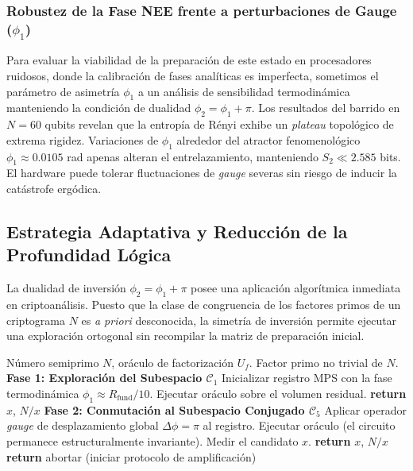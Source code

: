 \documentclass[12pt,a4paper]{article}
\theoremstyle{plain}
\theoremstyle{definition}
\theoremstyle{remark}
\begin{document}
\subsubsection*{Robustez de la Fase NEE frente a perturbaciones de Gauge ($\phi_1$)}

Para evaluar la viabilidad de la preparación de este estado en procesadores ruidosos, donde la calibración de fases analíticas es imperfecta, sometimos el parámetro de asimetría $\phi_1$ a un análisis de sensibilidad termodinámica manteniendo la condición de dualidad $\phi_2 = \phi_1 + \pi$. Los resultados del barrido en $N=60$ qubits revelan que la entropía de Rényi exhibe un \textit{plateau} topológico de extrema rigidez. Variaciones de $\phi_1$ alrededor del atractor fenomenológico $\phi_1 \approx 0.0105$ rad apenas alteran el entrelazamiento, manteniendo $S_2 \ll 2.585$ bits. El hardware puede tolerar fluctuaciones de \textit{gauge} severas sin riesgo de inducir la catástrofe ergódica.

\subsection{Estrategia Adaptativa y Reducción de la Profundidad Lógica}
\label{subsec:estrategia_adaptativa}

La dualidad de inversión $\phi_2 = \phi_1 + \pi$ posee una aplicación algorítmica inmediata en criptoanálisis. Puesto que la clase de congruencia de los factores primos de un criptograma $N$ es \textit{a priori} desconocida, la simetría de inversión permite ejecutar una exploración ortogonal sin recompilar la matriz de preparación inicial.

\begin{algorithm}[H]
\caption{Estrategia Adaptativa de Búsqueda Modular (MST)}
\label{alg:estrategia}
\begin{algorithmic}[1]
\Require Número semiprimo $N$, oráculo de factorización $U_f$.
\Ensure Factor primo no trivial de $N$.
\Statex
\State \textbf{Fase 1: Exploración del Subespacio $\mathcal{C}_1$}
\State Inicializar registro MPS con la fase termodinámica $\phi_1 \approx R_{\text{fund}}/10$.
\State Ejecutar oráculo sobre el volumen residual.
    \State \textbf{return} $x$, $N/x$
\EndIf
\Statex
\State \textbf{Fase 2: Conmutación al Subespacio Conjugado $\mathcal{C}_5$}
\State Aplicar operador \textit{gauge} de desplazamiento global $\Delta\phi = \pi$ al registro.
\State Ejecutar oráculo (el circuito permanece estructuralmente invariante).
\State Medir el candidato $x$.
    \State \textbf{return} $x$, $N/x$
\Else
    \State \textbf{return} abortar (iniciar protocolo de amplificación)
\EndIf
\end{algorithmic}
\end{algorithm}
\end{document}
